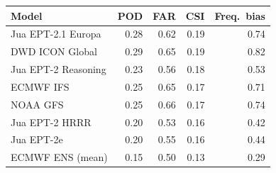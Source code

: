\begin{tabular}{lrrrr}
\toprule
Model & POD & FAR & CSI & Freq.\ bias \\
\midrule
Jua EPT-2.1 Europa & 0.28 & 0.62 & 0.19 & 0.74 \\
DWD ICON Global & 0.29 & 0.65 & 0.19 & 0.82 \\
Jua EPT-2 Reasoning & 0.23 & 0.56 & 0.18 & 0.53 \\
ECMWF IFS & 0.25 & 0.65 & 0.17 & 0.71 \\
NOAA GFS & 0.25 & 0.66 & 0.17 & 0.74 \\
Jua EPT-2 HRRR & 0.20 & 0.53 & 0.16 & 0.42 \\
Jua EPT-2e & 0.20 & 0.55 & 0.16 & 0.44 \\
ECMWF ENS (mean) & 0.15 & 0.50 & 0.13 & 0.29 \\
\bottomrule
\end{tabular}

